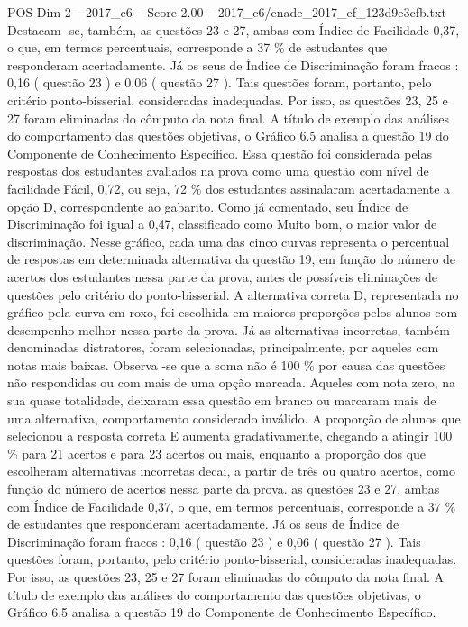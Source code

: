 \begin{textsample}{POS Dim 2 – 2017\_c6 – Score 2.00 – 2017\_c6/enade\_2017\_ef\_123d9e3cfb.txt}
Destacam -se, também, as questões 23 e 27, ambas com Índice de Facilidade 0,37, o que, em termos percentuais, corresponde a 37 \% de estudantes que responderam acertadamente.
Já os seus de Índice de Discriminação foram fracos : 0,16 ( questão 23 ) e 0,06 ( questão 27 ).
Tais questões foram, portanto, pelo critério ponto-bisserial, consideradas inadequadas.
Por isso, as questões 23, 25 e 27 foram eliminadas do cômputo da nota final.
A título de exemplo das análises do comportamento das questões objetivas, o Gráfico 6.5 analisa a questão 19 do Componente de Conhecimento Específico.
Essa questão foi considerada pelas respostas dos estudantes avaliados na prova como uma questão com nível de facilidade Fácil, 0,72, ou seja, 72 \% dos estudantes assinalaram acertadamente a opção D, correspondente ao gabarito.
Como já comentado, seu Índice de Discriminação foi igual a 0,47, classificado como Muito bom, o maior valor de discriminação.
Nesse gráfico, cada uma das cinco curvas representa o percentual de respostas em determinada alternativa da questão 19, em função do número de acertos dos estudantes nessa parte da prova, antes de possíveis eliminações de questões pelo critério do ponto-bisserial.
A alternativa correta D, representada no gráfico pela curva em roxo, foi escolhida em maiores proporções pelos alunos com desempenho melhor nessa parte da prova.
Já as alternativas incorretas, também denominadas distratores, foram selecionadas, principalmente, por aqueles com notas mais baixas.
Observa -se que a soma não é 100 \% por causa das questões não respondidas ou com mais de uma opção marcada.
Aqueles com nota zero, na sua quase totalidade, deixaram essa questão em branco ou marcaram mais de uma alternativa, comportamento considerado inválido.
A proporção de alunos que selecionou a resposta correta E aumenta gradativamente, chegando a atingir 100 \% para 21 acertos e para 23 acertos ou mais, enquanto a proporção dos que escolheram alternativas incorretas decai, a partir de três ou quatro acertos, como função do número de acertos nessa parte da prova. as questões 23 e 27, ambas com Índice de Facilidade 0,37, o que, em termos percentuais, corresponde a 37 \% de estudantes que responderam acertadamente.
Já os seus de Índice de Discriminação foram fracos : 0,16 ( questão 23 ) e 0,06 ( questão 27 ).
Tais questões foram, portanto, pelo critério ponto-bisserial, consideradas inadequadas.
Por isso, as questões 23, 25 e 27 foram eliminadas do cômputo da nota final.
A título de exemplo das análises do comportamento das questões objetivas, o Gráfico 6.5 analisa a questão 19 do Componente de Conhecimento Específico.

\end{textsample}
